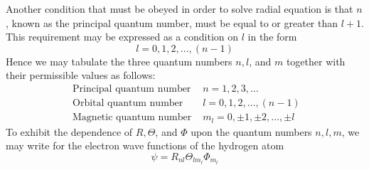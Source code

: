 Another condition that must be obeyed in order to solve radial equation is that $n$, known as the principal quantum number, must be equal to or greater than $l+1$. This requirement may be expressed as a condition on $l$ in the form
$$
l=0,1,2, \ldots,(n-1)
$$
Hence we may tabulate the three quantum numbers $n, l$, and $m$ together with their permissible values as follows:\\
$$\begin{array}{lc}
	\text { Principal quantum number } & n=1,2,3, \ldots \\
	\text { Orbital quantum number } & l=0,1,2, \ldots,(n-1) \\
	\text { Magnetic quantum number } & m_{l}=0, \pm 1, \pm 2, \ldots, \pm l
\end{array}$$
To exhibit the dependence of $R, \Theta$, and $\Phi$ upon the quantum numbers $n, l, m$, we may write for the electron wave functions of the hydrogen atom
$$
\psi=R_{n l} \Theta_{l m_{l}} \Phi_{m_{l}}
$$
